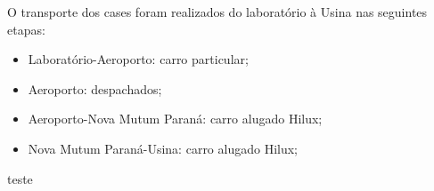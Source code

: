O transporte dos cases foram realizados do laboratório à Usina nas
seguintes etapas:
\begin{itemize}
  \item Laboratório-Aeroporto: carro particular;
  \item Aeroporto: despachados;
  \item Aeroporto-Nova Mutum Paraná: carro alugado Hilux;
  \item Nova Mutum Paraná-Usina: carro alugado Hilux;
\end{itemize} 

teste

 

\label{metodos}


